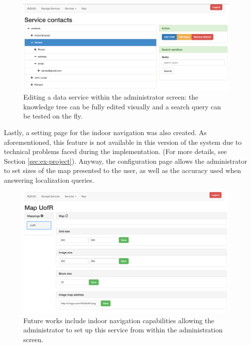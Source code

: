 \begin{figure}[htbp]
\begin{center}
\includegraphics[width=\textwidth]{figures/services.png}
\caption{Editing a data service within the administrator screen: the knowledge tree can be fully edited visually and a search query can be tested on the fly.}
\label{fig:sys_serv}
\end{center}
\end{figure}

Lastly, a setting page for the indoor navigation was also created.
As aforementioned, this feature is not available in this version of the system due to technical problems faced during the implementation.
(For more details, see Section \ref{sec:ex-project}).
Anyway, the configuration page allows the administrator to set sizes of the map presented to the user, as well as the accuracy used when answering localization queries.

\begin{figure}[htbp]
\begin{center}
\includegraphics[width=\textwidth]{figures/map.png}
\caption{Future works include indoor navigation capabilities allowing the administrator to set up this service from within the administration screen.}
\label{fig:sys_serv}
\end{center}
\end{figure}


